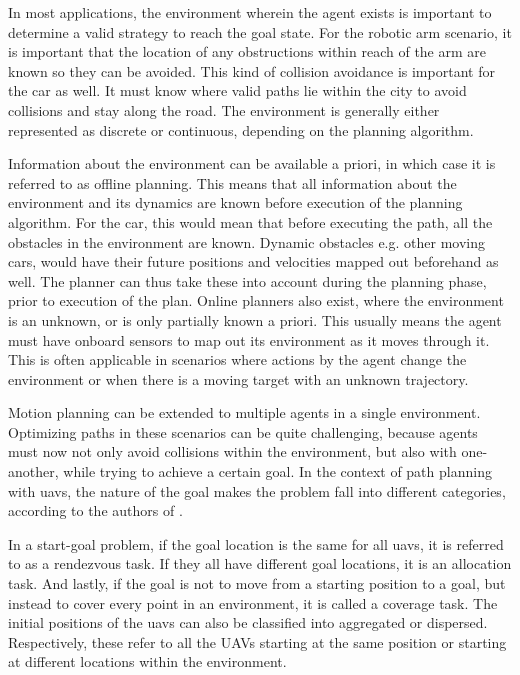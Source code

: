 In most applications, the environment wherein the agent exists is important to determine a valid strategy to reach the goal state. For the robotic arm scenario, it is important that the location of any obstructions within reach of the arm are known so they can be avoided. This kind of collision avoidance is important for the car as well. It must know where valid paths lie within the city to avoid collisions and stay along the road. The environment is generally either represented as discrete or continuous, depending on the planning algorithm.

Information about the environment can be available a priori, in which case it is referred to as offline planning. This means that all information about the environment and its dynamics are known before execution of the planning algorithm. For the car, this would mean that before executing the path, all the obstacles in the environment are known. Dynamic obstacles e.g. other moving cars, would have their future positions and velocities mapped out beforehand as well. The planner can thus take these into account during the planning phase, prior to execution of the plan. Online planners also exist, where the environment is an unknown, or is only partially known a priori. This usually means the agent must have onboard sensors to map out its environment as it moves through it. This is often applicable in scenarios where actions by the agent change the environment or when there is a moving target with an unknown trajectory.

Motion planning can be extended to multiple agents in a single environment. Optimizing paths in these scenarios can be quite challenging, because agents must now not only avoid collisions within the environment, but also with one-another, while trying to achieve a certain goal. In the context of path planning with \acsp{uav}, the nature of the goal makes the problem fall into different categories, according to the authors of \cite{Zhang2020}. 

In a start-goal problem, if the goal location is the same for all \acsp{uav}, it is referred to as a rendezvous task. If they all have different goal locations, it is an allocation task. And lastly, if the goal is not to move from a starting position to a goal, but instead to cover every point in an environment, it is called a coverage task. The initial positions of the \acsp{uav} can also be  classified into aggregated or dispersed. Respectively, these refer to all the UAVs starting at the same position or starting at different locations within the environment.

